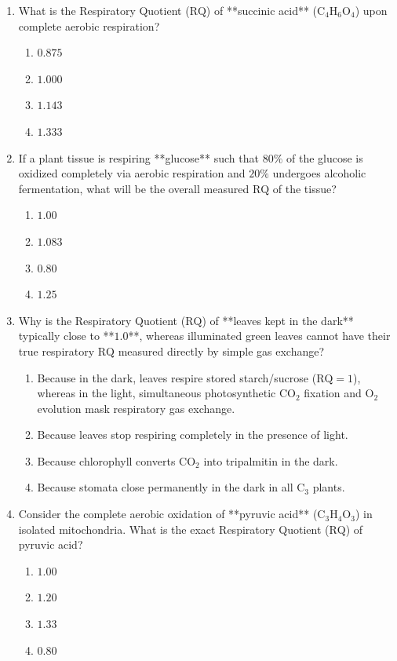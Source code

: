 \documentclass[11pt, a4paper]{article}
\begin{document}
\begin{enumerate}[label=\textbf{\arabic*.}]
\item What is the Respiratory Quotient ($\text{RQ}$) of **succinic acid** ($\text{C}_4\text{H}_6\text{O}_4$) upon complete aerobic respiration?
\begin{enumerate}[label=(\Alph*)]
    \item $0.875$
    \item $1.000$
    \item $1.143$
    \item $1.333$
\end{enumerate}

\item If a plant tissue is respiring **glucose** such that $80\%$ of the glucose is oxidized completely via aerobic respiration and $20\%$ undergoes alcoholic fermentation, what will be the overall measured $\text{RQ}$ of the tissue?
\begin{enumerate}[label=(\Alph*)]
    \item $1.00$
    \item $1.083$
    \item $0.80$
    \item $1.25$
\end{enumerate}

\item Why is the Respiratory Quotient ($\text{RQ}$) of **leaves kept in the dark** typically close to **$1.0$**, whereas illuminated green leaves cannot have their true respiratory $\text{RQ}$ measured directly by simple gas exchange?
\begin{enumerate}[label=(\Alph*)]
    \item Because in the dark, leaves respire stored starch/sucrose ($\text{RQ} = 1$), whereas in the light, simultaneous photosynthetic $\text{CO}_2$ fixation and $\text{O}_2$ evolution mask respiratory gas exchange.
    \item Because leaves stop respiring completely in the presence of light.
    \item Because chlorophyll converts $\text{CO}_2$ into tripalmitin in the dark.
    \item Because stomata close permanently in the dark in all $\text{C}_3$ plants.
\end{enumerate}

\item Consider the complete aerobic oxidation of **pyruvic acid** ($\text{C}_3\text{H}_4\text{O}_3$) in isolated mitochondria. What is the exact Respiratory Quotient ($\text{RQ}$) of pyruvic acid?
\begin{enumerate}[label=(\Alph*)]
    \item $1.00$
    \item $1.20$
    \item $1.33$
    \item $0.80$
\end{enumerate}


\end{enumerate}
\end{document}

